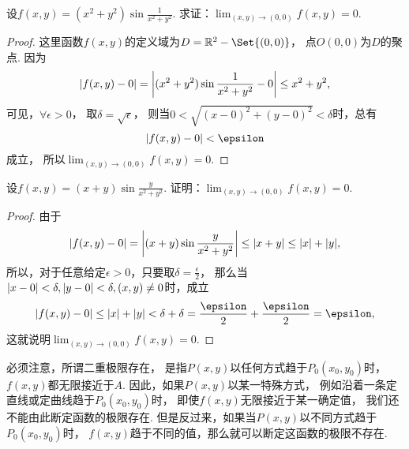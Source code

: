 \begin{example}
设\(f(x,y) = (x^2+y^2) \sin\frac1{x^2+y^2}\).
求证：\(\lim_{(x,y)\to(0,0)} f(x,y) = 0\).
\begin{proof}
这里函数\(f(x,y)\)的定义域为\(D = \mathbb{R}^2 - \Set{(0,0)}\)，
点\(O(0,0)\)为\(D\)的聚点.
因为\[
	\abs{f(x,y)-0}
	= \abs{(x^2+y^2) \sin\frac1{x^2+y^2} - 0}
	\leq x^2+y^2,
\]
可见，\(\forall\epsilon>0\)，
取\(\delta=\sqrt{\epsilon}\)，
则当\(0 < \sqrt{(x-0)^2+(y-0)^2} < \delta\)时，总有\[
	\abs{f(x,y)-0} < \epsilon
\]成立，
所以\(\lim_{(x,y)\to(0,0)} f(x,y) = 0\).
\end{proof}
\end{example}

\begin{example}
设\(f(x,y) = (x+y) \sin\frac{y}{x^2+y^2}\).
证明：\(\lim_{(x,y)\to(0,0)} f(x,y) = 0\).
\begin{proof}
由于\[
	\abs{f(x,y)-0}
	= \abs{(x+y) \sin\frac{y}{x^2+y^2}}
	\leq \abs{x+y}
	\leq \abs{x}+\abs{y},
\]
所以，对于任意给定\(\epsilon>0\)，只要取\(\delta=\frac\epsilon2\)，
那么当\(\abs{x-0}<\delta,\abs{y-0}<\delta,(x,y)\neq0\)时，成立\[
	\abs{f(x,y)-0}
	\leq \abs{x}+\abs{y}
	< \delta+\delta
	= \frac\epsilon2+\frac\epsilon2
	= \epsilon,
\]
这就说明\(\lim_{(x,y)\to(0,0)} f(x,y) = 0\).
\end{proof}
\end{example}

必须注意，所谓二重极限存在，
是指\(P(x,y)\)以任何方式趋于\(P_0(x_0,y_0)\)时，\(f(x,y)\)都无限接近于\(A\).
因此，如果\(P(x,y)\)以某一特殊方式，
例如沿着一条定直线或定曲线趋于\(P_0(x_0,y_0)\)时，
即使\(f(x,y)\)无限接近于某一确定值，
我们还不能由此断定函数的极限存在.
但是反过来，如果当\(P(x,y)\)以不同方式趋于\(P_0(x_0,y_0)\)时，
\(f(x,y)\)趋于不同的值，那么就可以断定这函数的极限不存在.

